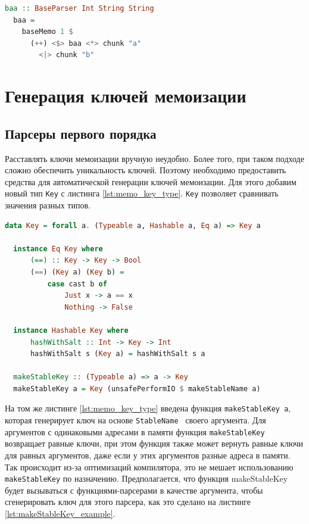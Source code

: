 \documentclass[times]{itmo-student-thesis}
\begin{document}
\begin{lstlisting}[language=Haskell,float=!h,caption={Парсер для строк $ba^*$},label={lst:baa_parser}]
  baa :: BaseParser Int String String
  baa =
    baseMemo 1 $
      (++) <$> baa <*> chunk "a"
        <|> chunk "b"
\end{lstlisting}

\section{Генерация ключей мемоизации}\label{sec:memoization_keys}

\subsection{Парсеры первого порядка}

Расставлять ключи мемоизации вручную неудобно. Более того, при таком подходе сложно обеспечить уникальность ключей. Поэтому
необходимо предоставить средства для автоматической генерации ключей мемоизации. Для этого добавим новый тип \lstinline{Key} 
с листинга \ref{lst:memo_key_type}. \lstinline{Key} позволяет сравнивать значения разных типов. 

\begin{lstlisting}[language=Haskell,float=!h,caption={Тип ключей мемоизации},label={lst:memo_key_type}]
  data Key = forall a. (Typeable a, Hashable a, Eq a) => Key a

  instance Eq Key where
      (==) :: Key -> Key -> Bool
      (==) (Key a) (Key b) =
          case cast b of
              Just x -> a == x
              Nothing -> False

  instance Hashable Key where
      hashWithSalt :: Int -> Key -> Int
      hashWithSalt s (Key a) = hashWithSalt s a

  makeStableKey :: (Typeable a) => a -> Key
  makeStableKey a = Key (unsafePerformIO $ makeStableName a)
\end{lstlisting}

На том же листинге \ref{lst:memo_key_type} введена функция \lstinline{makeStableKey a}, которая генерирует ключ на основе
\lstinline{StableName}~\cite{noauthor_systemmemstablename_nodate}
своего аргумента. Для аргументов с одинаковыми адресами в памяти функция \lstinline{makeStableKey} возвращает равные ключи,
при этом функция также может вернуть равные ключи для равных аргументов, даже если у этих аргументов разные адреса в
памяти. Так происходит из-за оптимизаций компилятора, это не мешает использованию \lstinline{makeStableKey} по назначению.
Предполагается, что функция makeStableKey будет вызываться с функциями-парсерами в качестве аргумента, чтобы
сгенерировать ключ для этого парсера, как это сделано на листинге \ref{lst:makeStableKey_example}.
\end{document}
